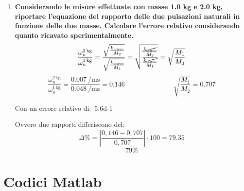 \documentclass[a4paper, 12pt, twoside]{report}
\begin{document}
\begin{enumerate}
\newpage
 	
 		\item \textbf{Considerando le misure effettuate con masse 1.0 kg e 2.0 kg, riportare l’equazione del rapporto delle due pulsazioni naturali in funzione delle due masse. Calcolare l’errore relativo considerando quanto ricavato sperimentalmente.}
 		\[\frac{\omega_n^{2\,\text{kg}}}{\omega_n^{1\,\text{kg}}} = \dfrac{\sqrt{\frac{k_{\text{trave}}}{M_2}}}{\sqrt{\frac{k_{\text{trave}}}{M_1}}} = \sqrt{\dfrac{\frac{\cancel{k_{\text{trave}}}}{M_2}}{\frac{\cancel{k_{\text{trave}}}}{M_1}}} = \sqrt{\dfrac{M_1}{M_2}}\]
 		\[\frac{\omega_n^{2\,\text{kg}}}{\omega_n^{1\,\text{kg}}} = \dfrac{\SI{0.007}{\per\milli\second}}{\SI{0.048}{\per\milli\second}} = 0.146 \hspace{3cm} \sqrt{\dfrac{M_1}{M_2}} = 0.707\]
 		
 		Con un errore relativo di:~\num{5.6d-1} \newline 
 		
 		Ovvero due rapporti differiscono del: 
 		\[\Delta\%=\left|\dfrac{0,146-0,707}{0,707}\right|\cdot100 = 79.35\]
 		\[79\%\]
	 	\end{enumerate}
		 
\newpage
{}	
\section{Codici Matlab}		
\end{document}
